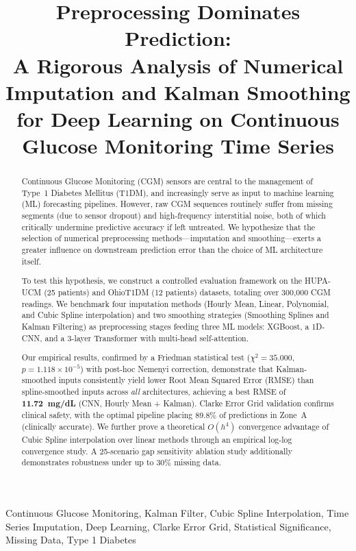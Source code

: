 \documentclass[pmlr,twocolumn,10pt]{jmlr} %
\title[Preprocessing Dominates Prediction]{Preprocessing Dominates Prediction: \\
A Rigorous Analysis of Numerical Imputation and Kalman Smoothing \\
for Deep Learning on Continuous Glucose Monitoring Time Series}
\author[Preprocessing Dominates Prediction]{\Name{Anonymous Author(s)}}
\begin{document}
\maketitle

\begin{abstract}
Continuous Glucose Monitoring (CGM) sensors are central to the management of Type~1 Diabetes Mellitus (T1DM), and increasingly serve as input to machine learning (ML) forecasting pipelines. However, raw CGM sequences routinely suffer from missing segments (due to sensor dropout) and high-frequency interstitial noise, both of which critically undermine predictive accuracy if left untreated. We hypothesize that the selection of numerical preprocessing methods---imputation and smoothing---exerts a greater influence on downstream prediction error than the choice of ML architecture itself.

To test this hypothesis, we construct a controlled evaluation framework on the HUPA-UCM (25 patients) and OhioT1DM (12 patients) datasets, totaling over 300,000 CGM readings. We benchmark four imputation methods (Hourly Mean, Linear, Polynomial, and Cubic Spline interpolation) and two smoothing strategies (Smoothing Splines and Kalman Filtering) as preprocessing stages feeding three ML models: XGBoost, a 1D-CNN, and a 3-layer Transformer with multi-head self-attention.

Our empirical results, confirmed by a Friedman statistical test ($\chi^2 = 35.000$, $p = 1.118 \times 10^{-5}$) with post-hoc Nemenyi correction, demonstrate that Kalman-smoothed inputs consistently yield lower Root Mean Squared Error (RMSE) than spline-smoothed inputs across \emph{all} architectures, achieving a best RMSE of \textbf{11.72~mg/dL} (CNN, Hourly Mean + Kalman). Clarke Error Grid validation confirms clinical safety, with the optimal pipeline placing 89.8\% of predictions in Zone~A (clinically accurate). We further prove a theoretical $O(h^4)$ convergence advantage of Cubic Spline interpolation over linear methods through an empirical log-log convergence study. A 25-scenario gap sensitivity ablation study additionally demonstrates robustness under up to 30\% missing data.
\end{abstract}
\begin{keywords}
Continuous Glucose Monitoring, Kalman Filter, Cubic Spline Interpolation, Time Series Imputation, Deep Learning, Clarke Error Grid, Statistical Significance, Missing Data, Type 1 Diabetes
\end{keywords}
\end{document}
